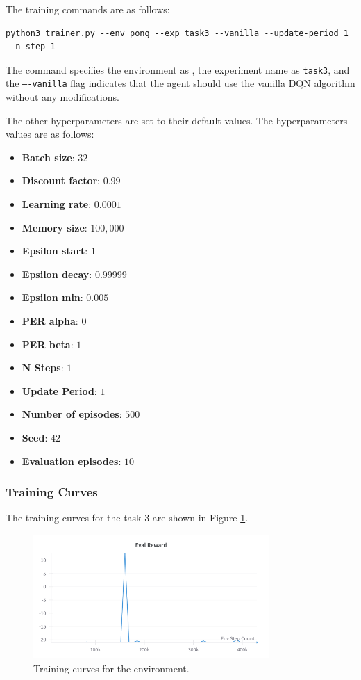 The training commands are as follows:

\begin{verbatim}
python3 trainer.py --env pong --exp task3 --vanilla --update-period 1 --n-step 1
\end{verbatim}

The command specifies the environment as \pong, the experiment name as \texttt{task3}, and the \texttt{----vanilla} flag indicates that the agent should use the vanilla DQN algorithm without any modifications.

The other hyperparameters are set to their default values.
The hyperparameters values are as follows:
\begin{itemize}
    \item \textbf{Batch size}: $32$
    \item \textbf{Discount factor}: $0.99$
    \item \textbf{Learning rate}: $0.0001$
    \item \textbf{Memory size}: $100,000$
    \item \textbf{Epsilon start}: $1$
    \item \textbf{Epsilon decay}: $0.99999$
    \item \textbf{Epsilon min}: $0.005$
    \item \textbf{PER alpha}: $0$
    \item \textbf{PER beta}: $1$
    \item \textbf{N Steps}: $1$
    \item \textbf{Update Period}: $1$
    \item \textbf{Number of episodes}: $500$
    \item \textbf{Seed}: $42$
    \item \textbf{Evaluation episodes}: $10$
\end{itemize}

\subsubsection{Training Curves}

The training curves for the task 3 are shown in Figure \ref{fig:pong-task3-training-curve}.
\begin{figure}[H]
    \centering
    \includegraphics[width=0.8\textwidth]{figures/task3.png}
    \caption{Training curves for the \pong environment.}
    \label{fig:pong-task3-training-curve}
\end{figure}

